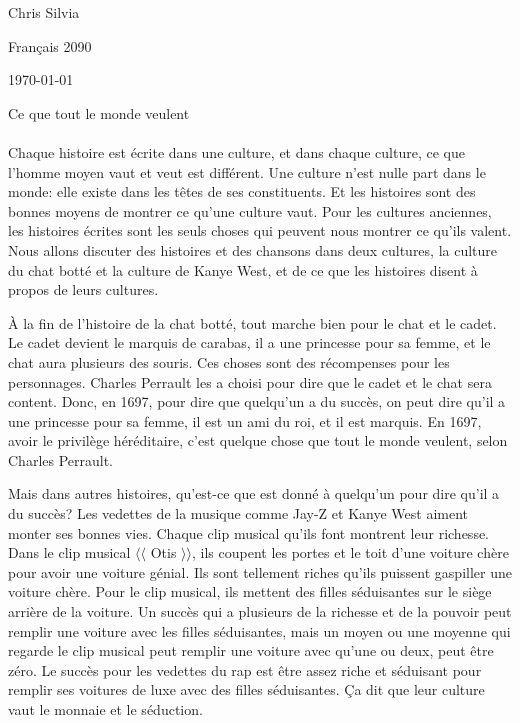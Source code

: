 \documentclass[12pt]{article}
\begin{document}
\begin{flushright}
Chris Silvia

Français 2090

\today

\end{flushright}

\begin{centering}

Ce que tout le monde veulent

\end{centering}

\paragraph{}
\begin{doublespace}

Chaque histoire est écrite dans une culture, et dans chaque culture, 
	ce que l'homme moyen vaut et veut est différent.
Une culture n'est nulle part dans le monde: elle existe dans les têtes 
	de ses constituents.
Et les histoires sont des bonnes moyens de montrer ce qu'une culture vaut.
Pour les cultures anciennes, les histoires écrites sont les seuls choses
	qui peuvent nous montrer ce qu'ils valent.
Nous allons discuter des histoires et des chansons dans deux cultures, 
	la culture du chat botté et la culture de Kanye West, et 
	de ce que les histoires disent à propos de leurs cultures. 

À la fin de l'histoire de la chat botté, tout marche bien pour le chat et le cadet.
Le cadet devient le marquis de carabas, il a une princesse pour sa femme,
	et le chat aura plusieurs des souris.
Ces choses sont des récompenses pour les personnages.
Charles Perrault les a choisi pour dire que le cadet et le chat sera content.
Donc, en 1697, pour dire que quelqu'un a du succès, on peut dire
	qu'il a une princesse pour sa femme, il est un ami du roi, et il
	est marquis.
En 1697, avoir le privilège héréditaire, c'est quelque chose que tout le monde 
	veulent, selon Charles Perrault.

Mais dans autres histoires, qu'est-ce que est donné à quelqu'un pour dire
	qu'il a du succès?
Les vedettes de la musique comme Jay-Z et Kanye West aiment monter ses bonnes vies.
Chaque clip musical qu'ils font montrent leur richesse.
Dans le clip musical $\langle \langle$ Otis $\rangle \rangle$, ils coupent les
	portes et le toit d'une voiture chère pour avoir une voiture génial.
Ils sont tellement riches qu'ils puissent gaspiller une voiture chère.
Pour le clip musical, ils mettent des filles séduisantes sur le siège arrière 
	de la voiture.
Un succès qui a plusieurs de la richesse et de la pouvoir peut remplir une voiture
	avec les filles séduisantes, mais un moyen ou une moyenne qui regarde le clip
	musical peut remplir une voiture avec qu'une ou deux, peut être zéro.
Le succès pour les vedettes du rap est être assez riche et séduisant pour remplir
	ses voitures de luxe avec des filles séduisantes.
Ça dit que leur culture vaut le monnaie et le séduction.


\end{doublespace}
\end{document}
